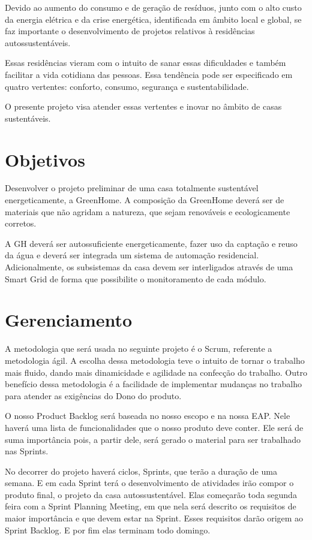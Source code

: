 	Devido ao aumento do consumo e de geração de resíduos, junto com o alto custo da energia elétrica e da crise energética, identificada em âmbito local e global, se faz importante o desenvolvimento de projetos relativos à residências autossustentáveis.

	Essas residências vieram com o intuito de sanar essas dificuldades e também facilitar a vida cotidiana das pessoas. Essa tendência pode ser especificado em quatro vertentes: conforto, consumo, segurança e sustentabilidade. 

	O presente projeto visa atender essas vertentes e inovar no âmbito de casas sustentáveis.


\section{Objetivos}

	Desenvolver o projeto preliminar de uma casa totalmente sustentável energeticamente, a GreenHome. A composição da GreenHome deverá ser de materiais que não agridam a natureza, que sejam renováveis e ecologicamente corretos. 

	A GH deverá ser autossuficiente energeticamente, fazer uso da captação e reuso da água e deverá ser integrada um sistema de automação residencial. Adicionalmente, os subsistemas da casa devem ser interligados através de uma Smart Grid de forma que possibilite o monitoramento de cada módulo.

\section{Gerenciamento}

	A metodologia que será usada no seguinte projeto é o Scrum, referente a metodologia ágil. A escolha dessa metodologia teve o intuito de tornar o trabalho mais fluido, dando mais dinamicidade e agilidade na confecção do trabalho. Outro benefício dessa metodologia é a facilidade de implementar mudanças no trabalho para atender as exigências do Dono do produto. 

	O nosso Product Backlog será baseada no nosso escopo e na nossa EAP. Nele haverá uma lista de funcionalidades que o nosso produto deve conter. Ele será de suma importância pois, a partir dele, será gerado o material para ser trabalhado nas Sprints.

	No decorrer do projeto haverá ciclos, Sprints, que terão a duração de uma semana. E em cada Sprint terá o desenvolvimento de atividades irão compor o produto final, o projeto da casa autossustentável. Elas começarão toda segunda feira com a Sprint Planning Meeting, em que nela será descrito os requisitos de maior importância e que devem estar na Sprint. Esses requisitos darão origem ao Sprint Backlog. E por fim elas terminam todo domingo.


